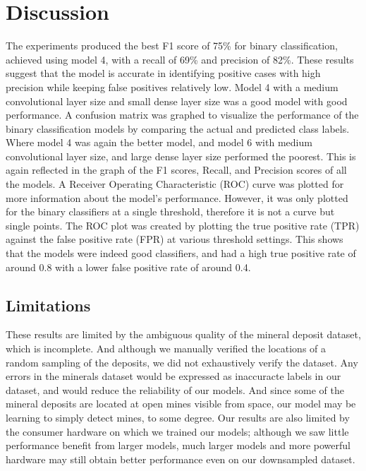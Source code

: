 \documentclass[10pt]{article}
\begin{document}
\section{Discussion}


The experiments produced the best F1 score of 75\% for binary classification, achieved using model 4,
with a recall of 69\% and precision of 82\%. These results suggest that the model is accurate in
identifying positive cases with high precision while keeping false positives relatively low. Model 4
with a medium convolutional layer size and small dense layer size was a good model with good performance.
A confusion matrix was graphed to visualize the performance of the binary classification models by
comparing the actual and predicted class labels. Where model 4 was again the better model, and model 6
with medium convolutional layer size, and large dense layer size performed the poorest. This is again
reflected in the graph of the F1 scores, Recall, and Precision scores of all the models.
A Receiver Operating Characteristic (ROC) curve was plotted for more information about the model's performance.
However, it was only plotted for the binary classifiers at a single threshold, therefore it is not a
curve but single points. The ROC plot was created by plotting the true positive rate (TPR) against the
false positive rate (FPR) at various threshold settings. This shows that the models were indeed good classifiers, and had a high true positive rate of around 0.8 with a lower false positive rate of around 0.4.

\subsection{Limitations}

These results are limited by the ambiguous quality of the mineral deposit dataset,
which is incomplete. And although we manually verified the locations of a random
sampling of the deposits, we did not exhaustively verify the dataset. Any errors
in the minerals dataset would be expressed as inaccuracte labels in our dataset,
and would reduce the reliability of our models. And since some of the mineral deposits
are located at open mines visible from space, our model may be learning to simply
detect mines, to some degree. Our results are also limited by the consumer hardware
on which we trained our models; although we saw little performance benefit from
larger models, much larger models and more powerful hardware may still obtain
better performance even on our downsampled dataset.
\end{document}
